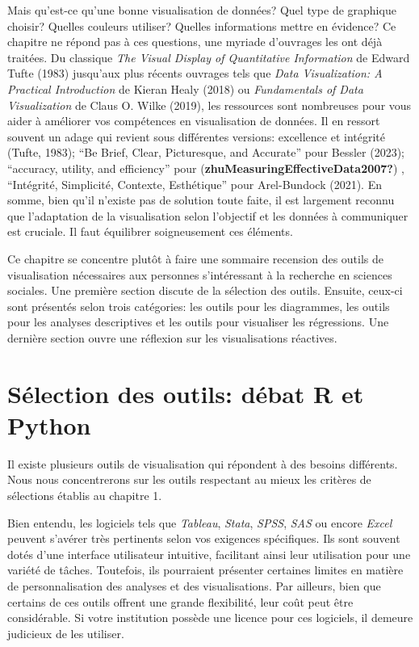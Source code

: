 \documentclass[
  letterpaper,
  DIV=11,
  numbers=noendperiod]{scrreprt}
\begin{document}
Mais qu'est-ce qu'une bonne visualisation de données? Quel type de
graphique choisir? Quelles couleurs utiliser? Quelles informations
mettre en évidence? Ce chapitre ne répond pas à ces questions, une
myriade d'ouvrages les ont déjà traitées. Du classique \emph{The Visual
Display of Quantitative Information} de Edward Tufte (1983) jusqu'aux
plus récents ouvrages tels que \emph{Data Visualization: A Practical
Introduction} de Kieran Healy (2018) ou \emph{Fundamentals of Data
Visualization} de Claus O. Wilke (2019), les ressources sont nombreuses
pour vous aider à améliorer vos compétences en visualisation de données.
Il en ressort souvent un adage qui revient sous différentes versions:
excellence et intégrité (Tufte, 1983); ``Be Brief, Clear, Picturesque,
and Accurate'' pour Bessler (2023); ``accuracy, utility, and
efficiency'' pour (\textbf{zhuMeasuringEffectiveData2007?}) ,
``Intégrité, Simplicité, Contexte, Esthétique'' pour Arel-Bundock
(2021). En somme, bien qu'il n'existe pas de solution toute faite, il
est largement reconnu que l'adaptation de la visualisation selon
l'objectif et les données à communiquer est cruciale. Il faut équilibrer
soigneusement ces éléments.

Ce chapitre se concentre plutôt à faire une sommaire recension des
outils de visualisation nécessaires aux personnes s'intéressant à la
recherche en sciences sociales. Une première section discute de la
sélection des outils. Ensuite, ceux-ci sont présentés selon trois
catégories: les outils pour les diagrammes, les outils pour les analyses
descriptives et les outils pour visualiser les régressions. Une dernière
section ouvre une réflexion sur les visualisations réactives.

\section{Sélection des outils: débat R et
Python}\label{suxe9lection-des-outils-duxe9bat-r-et-python}

Il existe plusieurs outils de visualisation qui répondent à des besoins
différents. Nous nous concentrerons sur les outils respectant au mieux
les critères de sélections établis au chapitre 1.

Bien entendu, les logiciels tels que \emph{Tableau}, \emph{Stata},
\emph{SPSS}, \emph{SAS} ou encore \emph{Excel} peuvent s'avérer très
pertinents selon vos exigences spécifiques. Ils sont souvent dotés d'une
interface utilisateur intuitive, facilitant ainsi leur utilisation pour
une variété de tâches. Toutefois, ils pourraient présenter certaines
limites en matière de personnalisation des analyses et des
visualisations. Par ailleurs, bien que certains de ces outils offrent
une grande flexibilité, leur coût peut être considérable. Si votre
institution possède une licence pour ces logiciels, il demeure judicieux
de les utiliser.
\end{document}
